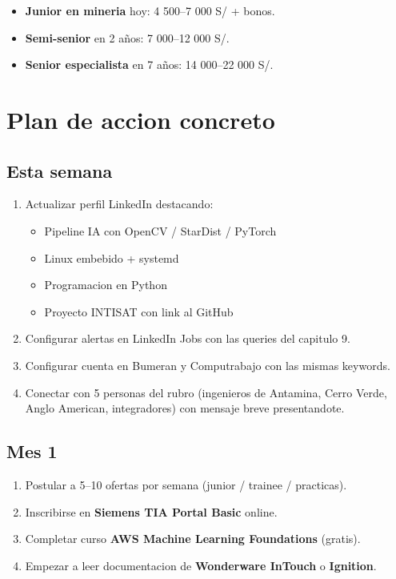 \documentclass[11pt,a4paper,oneside]{report}
\begin{document}
\begin{itemize}[leftmargin=2em]
  \item \textbf{Junior en mineria} hoy: 4 500--7 000 S/ + bonos.
  \item \textbf{Semi-senior} en 2 años: 7 000--12 000 S/.
  \item \textbf{Senior especialista} en 7 años: 14 000--22 000 S/.
\end{itemize}

\chapter{Plan de accion concreto}

\section{Esta semana}

\begin{enumerate}[leftmargin=2em]
  \item Actualizar perfil LinkedIn destacando:
        \begin{itemize}[leftmargin=1em]
          \item Pipeline IA con OpenCV / StarDist / PyTorch
          \item Linux embebido + systemd
          \item Programacion en Python
          \item Proyecto INTISAT con link al GitHub
        \end{itemize}
  \item Configurar alertas en LinkedIn Jobs con las queries del capitulo 9.
  \item Configurar cuenta en Bumeran y Computrabajo con las mismas keywords.
  \item Conectar con 5 personas del rubro (ingenieros de Antamina, Cerro Verde,
        Anglo American, integradores) con mensaje breve presentandote.
\end{enumerate}

\section{Mes 1}

\begin{enumerate}[leftmargin=2em]
  \item Postular a 5--10 ofertas por semana (junior / trainee / practicas).
  \item Inscribirse en \textbf{Siemens TIA Portal Basic} online.
  \item Completar curso \textbf{AWS Machine Learning Foundations} (gratis).
  \item Empezar a leer documentacion de \textbf{Wonderware InTouch} o \textbf{Ignition}.
\end{enumerate}
\end{document}
